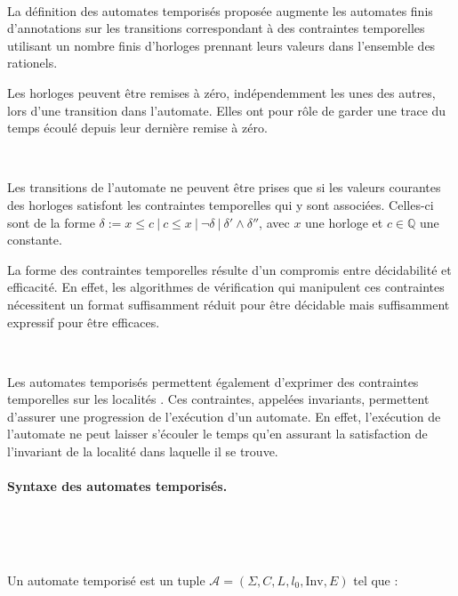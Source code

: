       
      ~

      La définition des automates temporisés proposée augmente les automates
      finis d'annotations sur les transitions correspondant à des contraintes
      temporelles utilisant un nombre finis d'horloges prennant leurs valeurs
      dans l'ensemble des rationels.

      Les horloges peuvent être remises à zéro, indépendemment les unes des
      autres, lors d'une transition dans l'automate. Elles ont pour rôle de
      garder une trace du temps écoulé depuis leur dernière remise à zéro.

      ~

      Les transitions de l'automate ne peuvent être prises que si les valeurs
      courantes des horloges satisfont les contraintes temporelles qui y sont
      associées. Celles-ci sont de la forme $\delta := x \le c ~|~ c \le x ~|~
      \neg \delta ~|~ \delta' \wedge \delta''$, avec $x$ une horloge et $c \in
      \mathbb{Q}$ une constante.

      La forme des contraintes temporelles résulte d'un compromis entre
      décidabilité et efficacité. En effet, les algorithmes de vérification qui
      manipulent ces contraintes nécessitent un format suffisamment réduit pour
      être décidable mais suffisamment expressif pour être efficaces.
      
      ~

      Les automates temporisés permettent également d'exprimer des contraintes
      temporelles sur les localités \cite{henzinger94}. Ces contraintes, appelées
      invariants, permettent d'assurer une progression de l'exécution d'un
      automate. En effet, l'exécution de l'automate ne peut laisser s'écouler le
      temps qu'en assurant la satisfaction de l'invariant de la localité dans
      laquelle il se trouve.
      
      \paragraph{Syntaxe des automates temporisés.} ~

        ~

        \noindent
        Un automate temporisé est un tuple $\mathcal{A} =
        (\Sigma,C,L,l_0,\mathrm{Inv},E)$ tel que :

